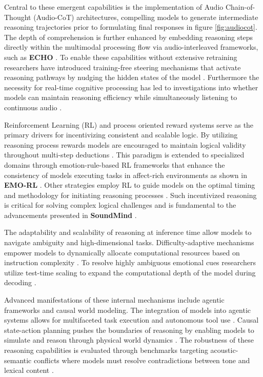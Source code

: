 Central to these emergent capabilities is the implementation of Audio Chain-of-Thought (Audio-CoT) architectures, compelling models to generate intermediate reasoning trajectories prior to formulating final responses \cite{xiong2025thinking} in figure \ref{fig:audiocot}. The depth of comprehension is further enhanced by embedding reasoning steps directly within the multimodal processing flow via audio-interleaved frameworks, such as \textbf{ECHO} \cite{wu2026echo}. To enable these capabilities without extensive retraining researchers have introduced training-free steering mechanisms that activate reasoning pathways by nudging the hidden states of the model \cite{ieong2026nudging}. Furthermore the necessity for real-time cognitive processing has led to investigations into whether models can maintain reasoning efficiency while simultaneously listening to continuous audio \cite{shih2025can}.

Reinforcement Learning (RL) and process oriented reward systems serve as the primary drivers for incentivizing consistent and scalable logic. By utilizing reasoning process rewards models are encouraged to maintain logical validity throughout multi-step deductions \cite{fan2025incentivizing}. This paradigm is extended to specialized domains through emotion-rule-based RL frameworks that enhance the consistency of models executing tasks in affect-rich environments as shown in \textbf{EMO-RL} \cite{li2025emo}. Other strategies employ RL to guide models on the optimal timing and methodology for initiating reasoning processes \cite{wu2025audio}. Such incentivized reasoning is critical for solving complex logical challenges and is fundamental to the advancements presented in \textbf{SoundMind} \cite{diao2025soundmind}.

The adaptability and scalability of reasoning at inference time allow models to navigate ambiguity and high-dimensional tasks. Difficulty-adaptive mechanisms empower models to dynamically allocate computational resources based on instruction complexity \cite{sheng2025think}. To resolve highly ambiguous emotional cues researchers utilize test-time scaling to expand the computational depth of the model during decoding \cite{jia2026decoding}.

Advanced manifestations of these internal mechanisms include agentic frameworks and causal world modeling. The integration of models into agentic systems allows for multifaceted task execution and autonomous tool use \cite{wijngaard2025audiotoolagent}. Causal state-action planning pushes the boundaries of reasoning by enabling models to simulate and reason through physical world dynamics \cite{zhou2025speech} . The robustness of these reasoning capabilities is evaluated through benchmarks targeting acoustic-semantic conflicts where models must resolve contradictions between tone and lexical content \cite{huang2026tone}. 

